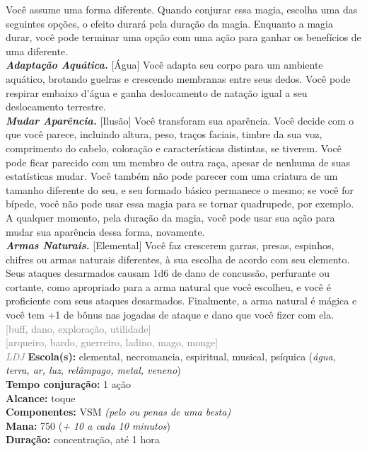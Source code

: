 \documentclass{RPG_Adventure}[2021/10/20]
\begin{document}
{\normalsize Você assume uma forma diferente. Quando conjurar essa magia, escolha uma das seguintes opções, o efeito durará pela duração da magia. Enquanto a magia durar, você pode terminar uma opção com uma ação para ganhar os benefícios de uma diferente.\\\t \textbf{\textit{Adaptação Aquática.}} [Água] Você adapta seu corpo para um ambiente aquático, brotando guelras e crescendo membranas entre seus dedos. Você pode respirar embaixo d’água e ganha deslocamento de natação igual a seu deslocamento terrestre.\\\t \textbf{\textit{Mudar Aparência.}} [Ilusão] Você transforam sua aparência. Você decide com o que você parece, incluindo altura, peso, traços faciais, timbre da sua voz, comprimento do cabelo, coloração e características distintas, se tiverem. Você pode ficar parecido com um membro de outra raça, apesar de nenhuma de suas estatísticas mudar. Você também não pode parecer com uma criatura de um tamanho diferente do seu, e seu formado básico permanece o mesmo; se você for bípede, você não pode usar essa magia para se tornar quadrupede, por exemplo. A qualquer momento, pela duração da magia, você pode usar sua ação para mudar sua aparência dessa forma, novamente.\\\t \textbf{\textit{Armas Naturais.}} [Elemental] Você faz crescerem garras, presas, espinhos, chifres ou armas naturais diferentes, à sua escolha de acordo com seu elemento. Seus ataques desarmados causam 1d6 de dano de concussão, perfurante ou cortante, como apropriado para a arma natural que você escolheu, e você é proficiente com seus ataques desarmados. Finalmente, a arma natural é mágica e você tem +1 de bônus nas jogadas de ataque e dano que você fizer com ela.\\}
{\scriptsize \textcolor{gray}{[buff, dano, exploração, utilidade]\\}}
{\scriptsize \textcolor{gray}{[arqueiro, bardo, guerreiro, ladino, mago, monge]\\}}
{\tiny \textcolor{gray}{\textit{LDJ}}}\jump{}
{\small \t \textbf{Escola(s):} elemental, necromancia, espiritual, musical, psíquica (\textit{água, terra, ar, luz, relâmpago, metal, veneno})\\\t \textbf{Tempo conjuração:} 1 ação\\\t \textbf{Alcance:} toque\\\t \textbf{Componentes:} VSM \textit{(pelo ou penas de uma besta)}\\\t \textbf{Mana:} 750 (\textit{+ 10 a cada 10 minutos})\\\t \textbf{Duração:} concentração, até 1 hora\\}
\end{document}
